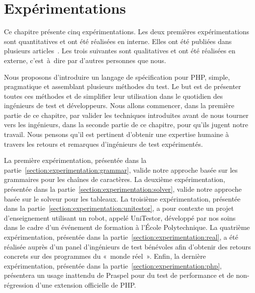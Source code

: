 \chapter{Expérimentations}
\label{chapter:experimentations}

\mminitoc

Ce chapitre présente cinq expérimentations. Les deux premières expérimentations
sont {\strong quantitatives} et ont été réalisées en interne. Elles ont été
publiées dans plusieurs articles~. Les trois suivantes sont {\strong qualitatives} et ont été
réalisées en externe, c'est~à~dire par d'autres personnes que nous.

Nous proposons d'introduire un langage de spécification pour PHP, simple,
pragmatique et assemblant plusieurs méthodes du test. Le but est de présenter
toutes ces méthodes et de simplifier leur utilisation dans le quotidien des
ingénieurs de test et développeurs. Nous allons commencer, dans la première
partie de ce chapitre, par valider les techniques introduites avant de nous
tourner vers les ingénieurs, dans la seconde partie de ce chapitre, pour qu'ils
jugent notre travail. Nous pensons qu'il est pertinent d'obtenir une expertise
humaine à travers les retours et remarques d'ingénieurs de test expérimentés.

La première expérimentation, présentée dans la
partie~\ref{section:experimentation:grammar}, valide notre approche basée sur
les grammaires pour les chaînes de caractères. La deuxième expérimentation,
présentée dans la partie~\ref{section:experimentation:solver}, valide notre
approche basée sur le solveur pour les tableaux. La troisième expérimentation,
présentée dans la partie~\ref{section:experimentation:unitestor}, a pour
contexte un projet d'enseignement utilisant un robot, appelé UniTestor,
développé par nos soins dans le cadre d'un événement de formation à l'École
Polytechnique. La quatrième expérimentation, présentée dans la
partie~\ref{section:experimentation:real}, a été réalisée auprès d'un panel
d'ingénieurs de test bénévoles afin d'obtenir des retours concrets sur des
programmes du «~monde réel~». Enfin, la dernière expérimentation, présentée dans
la partie~\ref{section:experimentation:php}, présentera un usage inattendu de
Praspel pour du test de performance et de non-régression d'une extension
officielle de PHP.

